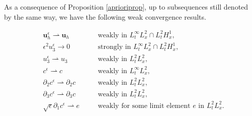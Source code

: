 \documentclass[11pt]{article}
\begin{document}
As a consequence of Proposition \ref{aprioriprop}, up to subsequences still denoted by the same way, we have the following weak convergence results.

\begin{align} 
& \mathbf{u}_h^\epsilon \rightharpoonup \mathbf{u}_h &\quad & \text{weakly in $L_t^\infty L_x^2 \cap L_t^2 H_x^1$,} \label{WeakConvUHEps} \\
& \epsilon^2 u_3^\epsilon \to 0 &\quad & \text{strongly in $L_t^\infty L_x^2 \cap L_t^2 H_x^1$,} \label{WeakConvU3Eps} \\
& u_3^\epsilon \rightharpoonup u_3 &\quad & \text{weakly in $L_t^2 L_x^2$,} \label{WeakConvU3NoEps} \\
& c^\epsilon \rightharpoonup c &\quad & \text{weakly in $L_t^\infty L_x^2$,} \label{WeakConvCEps1} \\
& \partial_2 c^\epsilon \rightharpoonup \partial_2 c &\quad & \text{weakly in $L_t^2 L_x^2$,} \label{WeakConvCEps2} \\
& \partial_3 c^\epsilon \rightharpoonup \partial_3 c &\quad & \text{weakly in $L_t^2 L_x^2$,} \label{WeakConvCEps3} \\
& \sqrt{\epsilon} \partial_1 c^\epsilon \rightharpoonup e &\quad & \text{weakly for some limit element $e$ in $L_t^2 L_x^2$.} \label{WeakConvCEps4}
\end{align}
\end{document}
